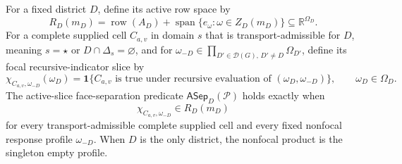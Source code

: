 For a fixed district \(D\), define its active row space by
\[
R_D(m_D)=\operatorname{row}(A_D)+
\operatorname{span}\{e_\omega:\omega\in Z_D(m_D)\}
\subseteq\mathbb R^{\Omega_D}.
\]
For a complete supplied cell \(C_{a,v}\) in domain \(s\) that is transport-admissible for \(D\), meaning \(s=\star\) or \(D\cap\Delta_s=\varnothing\), and for
\(\omega_{-D}\in\prod_{D'\in\mathcal D(G),\,D'\ne D}\Omega_{D'}\), define its focal recursive-indicator slice by
\[
\chi_{C_{a,v},\omega_{-D}}(\omega_D)
=\mathbf 1\{C_{a,v}\text{ is true under recursive evaluation of }
(\omega_D,\omega_{-D})\},
\qquad \omega_D\in\Omega_D.
\]
The active-slice face-separation predicate \(\mathsf{ASep}_D(\mathcal P)\) holds exactly when
\[
\chi_{C_{a,v},\omega_{-D}}\in R_D(m_D)
\]
for every transport-admissible complete supplied cell and every fixed nonfocal response profile \(\omega_{-D}\).  When \(D\) is the only district, the nonfocal product is the singleton empty profile.